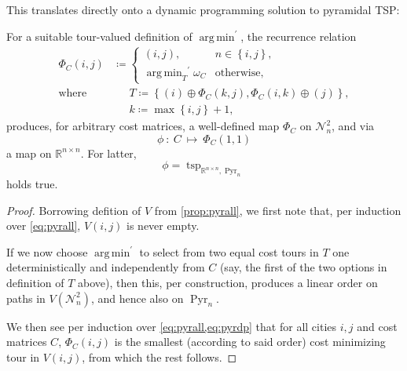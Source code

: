 \documentclass[index=totoc,bibliography=totoc]{scrartcl}
\newcommand{\annotation}[1]{\marginpar{\small\itshape\color{green}#1}}
\DeclareMathOperator*{\argmin}{arg\,min}
\numberwithin{equation}{section}
\numberwithin{figure}{section}
\numberwithin{table}{section}
\begin{document}
This translates directly onto a dynamic programming solution to pyramidal TSP:
\begin{corollary}
\label{cor:pyrdp}
\annotation{layout!}
  For a suitable tour-valued definition of $\argmin^\prime$, the recurrence relation
  \begin{align}
    \label{eq:pyrdp}
    \Phi_C\left(i,j\right) & \coloneqq
    \begin{cases}
      \left(i,j\right), & n \in \left\{i,j\right\}, \\
      {\displaystyle \argmin_T}^\prime \omega_C & \text{otherwise},
    \end{cases}
    \\
    \text{where} & \phantom{\coloneqq}
    T \coloneqq
    \left\{
    \left(i\right) \oplus \Phi_C\left(k,j\right),
    \Phi_C\left(i,k\right) \oplus \left(j\right)
    \right\},
    \nonumber
    \\
    & \phantom{\coloneqq}
    k \coloneqq \max\left\{i,j\right\}+1,
    \nonumber
  \end{align}
  produces, for arbitrary cost matrices, a well-defined map $\Phi_C$ on $\mathcal{N}_n^2$,
  and via
  \[
    \phi~:~C~\mapsto~\Phi_C\left(1,1\right)
  \]
  a map on $\mathbb{R}^{n \times n}$.
  For latter,
  \[
    \phi = \operatorname{tsp}_{\mathbb{R}^{n \times n},\operatorname{Pyr}_n}
  \]
  holds true.
\end{corollary}
\begin{proof}
  Borrowing defition of $V$ from \cref{prop:pyrall}, we first note that,
  per induction over \eqref{eq:pyrall}, $V\left(i,j\right)$ is never empty.

  If we now choose $\argmin^\prime$ to select from two equal cost tours in
  $T$ one deterministically and independently from $C$ (say, the first of
  the two options in definition of $T$ above), then this, per construction,
  produces a linear order on paths in $V\left(\mathcal{N}_n^2\right)$, and
  hence also on $\operatorname{Pyr}_n$.

  We then see per induction over \cref{eq:pyrall,eq:pyrdp} that for all
  cities $i,j$ and cost matrices $C$, $\Phi_C\left(i,j\right)$ is the
  smallest (according to said order) cost minimizing tour in $V\left(i,j\right)$,
  from which the rest follows.
\end{proof}
\end{document}
